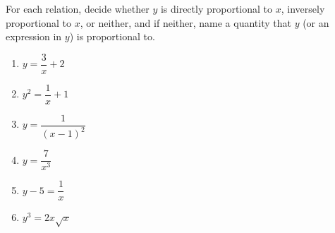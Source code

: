 For each relation, decide whether $y$ is directly proportional to $x$, inversely proportional to $x$, or neither, and if neither, name a quantity that $y$ (or an expression in $y$) is proportional to.
\begin{enumerate}
\item[(1)] $y=\dfrac3x+2$
\item[(2)] $y^2=\dfrac1x+1$
\item[(3)] $y=\dfrac1{(x-1)^2}$
\item[(4)] $y=\dfrac7{x^3}$
\item[(5)] $y-5=\dfrac1x$
\item[(6)] $y^3=2x\sqrt x$
\end{enumerate}
